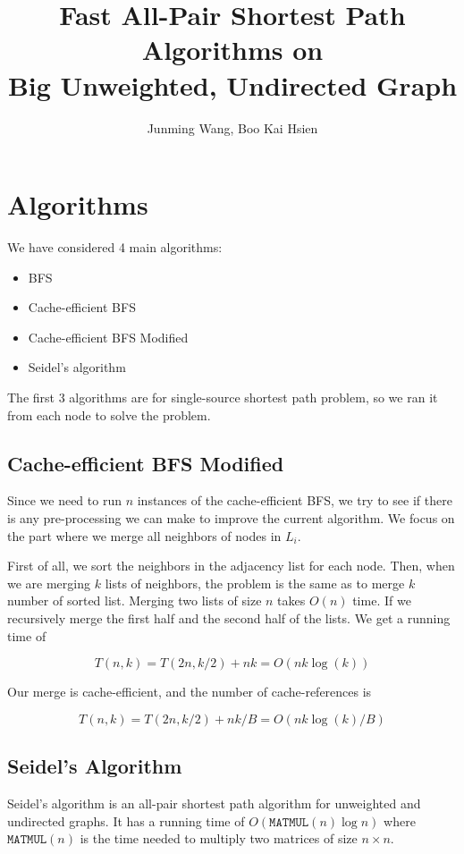 \documentclass[12pt]{article}
\title{Fast All-Pair Shortest Path Algorithms on \\ Big Unweighted, Undirected Graph}
\author{Junming Wang, Boo Kai Hsien}
\begin{document}
\maketitle
\pagebreak

\section{Algorithms}

We have considered 4 main algorithms:

\begin{itemize}
	\item BFS
	\item Cache-efficient BFS
	\item Cache-efficient BFS Modified
	\item Seidel's algorithm
\end{itemize}

The first 3 algorithms are for single-source shortest path problem, so we ran it from each node to solve the problem. 

\subsection{Cache-efficient BFS Modified}

Since we need to run $n$ instances of the cache-efficient BFS, we try to see if there is any pre-processing we can make to improve the current algorithm. We focus on the part where we merge all neighbors of nodes in $L_i$.

First of all, we sort the neighbors in the adjacency list for each node. Then, when we are merging $k$ lists of neighbors, the problem is the same as to merge $k$ number of sorted list. Merging two lists of size $n$ takes $O(n)$ time. If we recursively merge the first half and the second half of the lists. We get a running time of

$$T(n,k) = T(2n, k/2) + nk = O(nk\log(k))$$

Our merge is cache-efficient, and the number of cache-references is

$$T(n,k) = T(2n, k/2) + nk / B = O(nk \log(k)/ B)$$

\subsection{Seidel's Algorithm}

Seidel's algorithm is an all-pair shortest path algorithm for unweighted and undirected graphs. It has a running time of $O(\texttt{MATMUL}(n)\log n)$ where $\texttt{MATMUL}(n)$ is the time needed to multiply two matrices of size $n\times n$.
\end{document}
